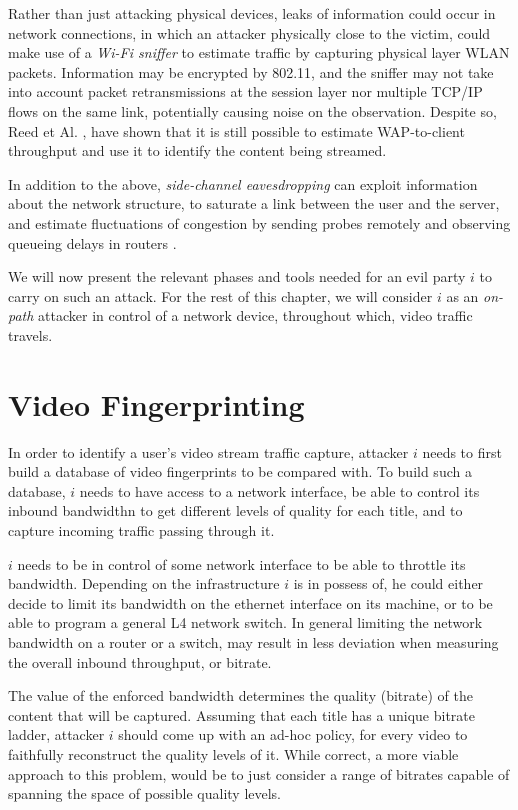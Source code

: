 Rather than just attacking physical devices, leaks of information could occur
in network connections, in which an attacker physically close to the victim,
could make use of a \emph{Wi-Fi sniffer} to estimate traffic by capturing
physical layer WLAN packets. Information may be encrypted by 802.11, and the
sniffer may not take into account packet retransmissions at the session layer
nor multiple TCP/IP flows on the same link, potentially causing noise on the
observation. Despite so, Reed et Al. \cite{leaky_streams}, have shown that it
is still possible to estimate WAP-to-client throughput and use it to identify
the content being streamed.

In addition to the above, \emph{side-channel eavesdropping} can exploit
information about the network structure, to saturate a link between the user
and the server, and estimate fluctuations of congestion by sending probes
remotely and observing queueing delays in routers \cite{side_channel}. 

We will now present the relevant phases and tools needed for an evil party $i$
to carry on such an attack. For the rest of this chapter, we will consider $i$
as an \emph{on-path} attacker in control of a network device, throughout which,
video traffic travels.

\section{Video Fingerprinting}

In order to identify a user's video stream traffic capture, attacker $i$ needs
to first build a database of video fingerprints to be compared with. To build
such a database, $i$ needs to have access to a network interface, be able to
control its inbound bandwidthn to get different levels of quality for each
title, and to capture incoming traffic passing through it.

$i$ needs to be in control of some network interface to be able to throttle its
bandwidth. Depending on the infrastructure $i$ is in possess of, he could
either decide to limit its bandwidth on the ethernet interface on its machine,
or to be able to program a general L4 network switch. In general limiting the
network bandwidth on a router or a switch, may result in less deviation when
measuring the overall inbound throughput, or bitrate.

The value of the enforced bandwidth determines the quality (bitrate) of the
content that will be captured. Assuming that each title has a unique bitrate
ladder, attacker $i$ should come up with an ad-hoc policy, for every video to
faithfully reconstruct the quality levels of it. While correct, a more viable
approach to this problem, would be to just consider a range of bitrates capable
of spanning the space of possible quality levels. 

